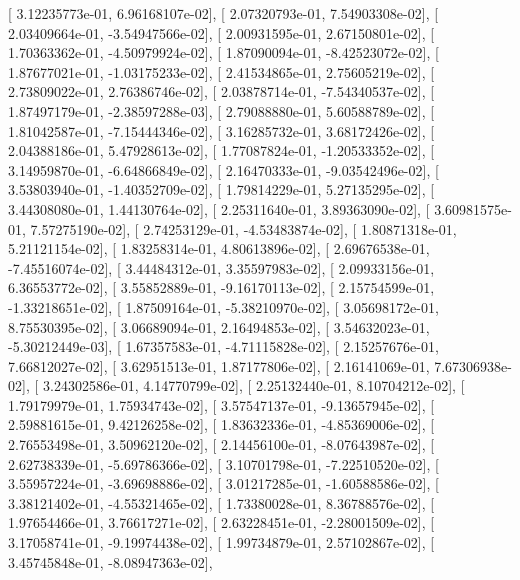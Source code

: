 \documentclass{article}
\begin{document}
       [  3.12235773e-01,   6.96168107e-02],
       [  2.07320793e-01,   7.54903308e-02],
       [  2.03409664e-01,  -3.54947566e-02],
       [  2.00931595e-01,   2.67150801e-02],
       [  1.70363362e-01,  -4.50979924e-02],
       [  1.87090094e-01,  -8.42523072e-02],
       [  1.87677021e-01,  -1.03175233e-02],
       [  2.41534865e-01,   2.75605219e-02],
       [  2.73809022e-01,   2.76386746e-02],
       [  2.03878714e-01,  -7.54340537e-02],
       [  1.87497179e-01,  -2.38597288e-03],
       [  2.79088880e-01,   5.60588789e-02],
       [  1.81042587e-01,  -7.15444346e-02],
       [  3.16285732e-01,   3.68172426e-02],
       [  2.04388186e-01,   5.47928613e-02],
       [  1.77087824e-01,  -1.20533352e-02],
       [  3.14959870e-01,  -6.64866849e-02],
       [  2.16470333e-01,  -9.03542496e-02],
       [  3.53803940e-01,  -1.40352709e-02],
       [  1.79814229e-01,   5.27135295e-02],
       [  3.44308080e-01,   1.44130764e-02],
       [  2.25311640e-01,   3.89363090e-02],
       [  3.60981575e-01,   7.57275190e-02],
       [  2.74253129e-01,  -4.53483874e-02],
       [  1.80871318e-01,   5.21121154e-02],
       [  1.83258314e-01,   4.80613896e-02],
       [  2.69676538e-01,  -7.45516074e-02],
       [  3.44484312e-01,   3.35597983e-02],
       [  2.09933156e-01,   6.36553772e-02],
       [  3.55852889e-01,  -9.16170113e-02],
       [  2.15754599e-01,  -1.33218651e-02],
       [  1.87509164e-01,  -5.38210970e-02],
       [  3.05698172e-01,   8.75530395e-02],
       [  3.06689094e-01,   2.16494853e-02],
       [  3.54632023e-01,  -5.30212449e-03],
       [  1.67357583e-01,  -4.71115828e-02],
       [  2.15257676e-01,   7.66812027e-02],
       [  3.62951513e-01,   1.87177806e-02],
       [  2.16141069e-01,   7.67306938e-02],
       [  3.24302586e-01,   4.14770799e-02],
       [  2.25132440e-01,   8.10704212e-02],
       [  1.79179979e-01,   1.75934743e-02],
       [  3.57547137e-01,  -9.13657945e-02],
       [  2.59881615e-01,   9.42126258e-02],
       [  1.83632336e-01,  -4.85369006e-02],
       [  2.76553498e-01,   3.50962120e-02],
       [  2.14456100e-01,  -8.07643987e-02],
       [  2.62738339e-01,  -5.69786366e-02],
       [  3.10701798e-01,  -7.22510520e-02],
       [  3.55957224e-01,  -3.69698886e-02],
       [  3.01217285e-01,  -1.60588586e-02],
       [  3.38121402e-01,  -4.55321465e-02],
       [  1.73380028e-01,   8.36788576e-02],
       [  1.97654466e-01,   3.76617271e-02],
       [  2.63228451e-01,  -2.28001509e-02],
       [  3.17058741e-01,  -9.19974438e-02],
       [  1.99734879e-01,   2.57102867e-02],
       [  3.45745848e-01,  -8.08947363e-02],
\end{document}
